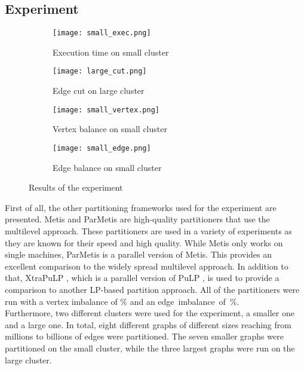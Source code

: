 \documentclass[acmsmall,nonacm,screen,review]{acmart}
\begin{document}
\subsection{Experiment}
\begin{figure}[bt!]
     \centering
     \begin{subfigure}[b]{0.45\textwidth}
         \centering
         \texttt{[image: small\_exec.png]}
         \caption{Execution time on small cluster}
         \label{small_exec}
     \end{subfigure}
     \hfill
     \begin{subfigure}[b]{0.45\textwidth}
         \centering
         \texttt{[image: large\_cut.png]}
         \caption{Edge cut on large cluster}
         \label{large_cut}
     \end{subfigure}
     \begin{subfigure}[b]{0.45\textwidth}
         \centering
         \texttt{[image: small\_vertex.png]}
         \caption{Vertex balance on small cluster}
         \label{small_vertex}
     \end{subfigure}
     \hfill
     \begin{subfigure}[b]{0.45\textwidth}
         \centering
         \texttt{[image: small\_edge.png]}
         \caption{Edge balance on small cluster}
         \label{small_edge}
     \end{subfigure}
     \caption{Results of the experiment}
     \label{combi}
\end{figure}
First of all, the other partitioning frameworks used for the experiment are presented. Metis \cite{Metis} and ParMetis \cite{ParMetis} are high-quality partitioners that use the multilevel approach. These partitioners are used in a variety of experiments as they are known for their speed and high quality. While Metis only works on single machines, ParMetis is a parallel version of Metis. This provides an excellent comparison to the widely spread multilevel approach. In addition to that, XtraPuLP \cite{XtraPuLP}, which is a parallel version of PuLP \cite{PuLP}, is used to provide a comparison to another LP-based partition approach. All of the partitioners were run with a vertex imbalance of \% and an \hbox{edge imbalance of \%.} \\
Furthermore, two different clusters were used for the experiment, a smaller one and a large one. In total, eight different graphs of different sizes reaching from millions to billions of edges were partitioned. The seven smaller graphs were partitioned on the small cluster, while the three largest graphs were run on the large cluster.\\
\end{document}
